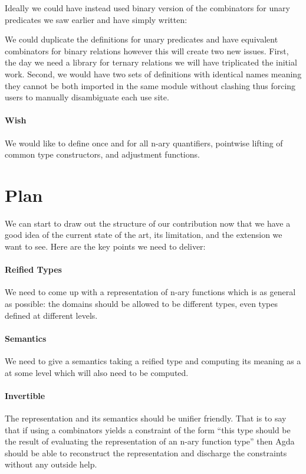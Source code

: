
Ideally we could have instead used binary version of the combinators for unary
predicates we saw earlier and have simply written:


We could duplicate the definitions for unary predicates and have equivalent
combinators for binary relations however this will create two new issues.
First, the day we need a library for ternary relations we will have triplicated
the initial work. Second, we would have two sets of definitions with identical
names meaning they cannot be both imported in the same module without clashing
thus forcing users to manually disambiguate each use site.

\paragraph{Wish} We would like to define once and for all n-ary quantifiers,
pointwise lifting of common type constructors, and adjustment functions.

\section{Plan} We can start to draw out the structure of our contribution now
that we have a good idea of the current state of the art, its limitation, and
the extension we want to see. Here are the key points we need to deliver:

\paragraph{Reified Types} We need to come up with a representation of n-ary
functions which is as general as possible: the domains should be allowed to
be different types, even types defined at different levels.

\paragraph{Semantics} We need to give a semantics taking a reified type and
computing its meaning as a  at some level which will also need to
be computed.

\paragraph{Invertible} The representation and its semantics should be unifier
friendly. That is to say that if using a combinators yields a constraint of
the form ``this type should be the result of evaluating the representation of
an n-ary function type'' then Agda should be able to reconstruct the
representation and discharge the constraints without any outside help.


